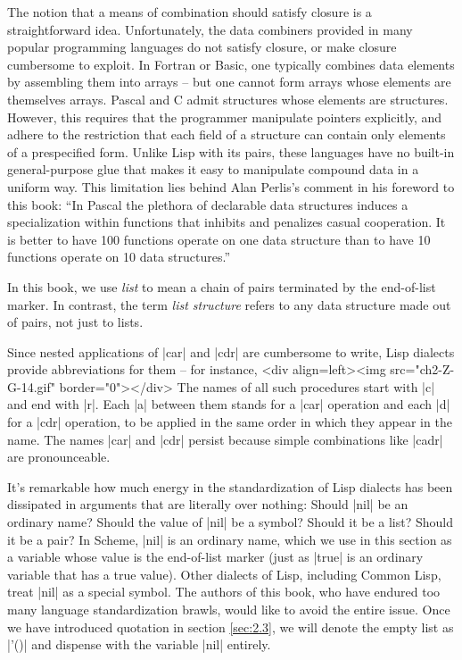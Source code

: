 \begin{Exercise}
\begin{Exercise}
\begin{Exercise}
\begin{Exercise}
\begin{Exercise}
\begin{Exercise}
\begin{Exercise}
\begin{Exercise}
\begin{Exercise}
\begin{Exercise}
\begin{Exercise}
\begin{Exercise}
The notion that a means of
combination should satisfy closure is a straightforward idea.
Unfortunately, the data combiners provided in many popular programming
languages do not satisfy closure, or make closure cumbersome to
exploit.  In Fortran or Basic, one typically combines data elements by
assembling them into arrays -- but one cannot form arrays whose
elements are themselves arrays.  Pascal and C admit structures whose
elements are structures.  However, this requires that the programmer
manipulate pointers explicitly, and adhere to the restriction that
each field of a structure can contain only elements of a prespecified form.
Unlike
Lisp with its pairs, these languages have no built-in general-purpose
glue that makes it easy to manipulate compound data in a uniform way.
This limitation lies behind Alan Perlis's comment in his foreword to
this book: ``In Pascal the plethora of declarable data structures
induces a specialization within functions that inhibits and penalizes
casual cooperation.  It is better to have 100 functions operate on one
data structure than to have 10 functions operate on 10 data
structures.''

In this book, we use \textit{list} to mean a chain of
pairs terminated by the end-of-list marker.  In contrast, the term
\textit{list structure} refers to any data structure made out of pairs,
not just to lists.

Since nested applications of \scheme|car| and \scheme|cdr|
are cumbersome to write, Lisp dialects provide abbreviations for
them -- for instance,
<div align=left><img src="ch2-Z-G-14.gif" border="0"></div>
The names of all such procedures start with \scheme|c| and end with \scheme|r|.  Each \scheme|a| between them stands for a \scheme|car| operation and
each \scheme|d| for a \scheme|cdr| operation, to be applied in the same order
in which they appear in the name.  The names \scheme|car| and \scheme|cdr|
persist because simple combinations like \scheme|cadr| are
pronounceable.

It's remarkable how much energy in the
standardization of Lisp dialects has been dissipated in arguments that
are literally over nothing: Should \scheme|nil| be an ordinary name?
Should the value of \scheme|nil| be a symbol?  Should it be a list?
Should it be a pair?  In Scheme, \scheme|nil| is an ordinary name,
which we use in this section as a variable whose value is
the end-of-list marker (just as \scheme|true| is an ordinary variable
that has a true value).  Other dialects of
Lisp, including Common Lisp, treat \scheme|nil| as a special symbol.  The
authors of this book, who have endured too many language
standardization brawls, would like to avoid the entire issue.  Once we
have introduced quotation in section \ref{sec:2.3}, we will
denote the empty list as \scheme|'()| and dispense with the
variable \scheme|nil| entirely.


\end{Exercise}
\end{Exercise}
\end{Exercise}
\end{Exercise}
\end{Exercise}
\end{Exercise}
\end{Exercise}
\end{Exercise}
\end{Exercise}
\end{Exercise}
\end{Exercise}
\end{Exercise}
